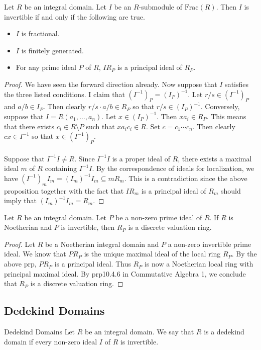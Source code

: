 \documentclass[a4paper]{article}
\begin{document}
\begin{prp}{}{} Let $R$ be an integral domain. Let $I$ be an $R$-submodule of $\text{Frac}(R)$. Then $I$ is invertible if and only if the following are true. 
\begin{itemize}
\item $I$ is fractional. 
\item $I$ is finitely generated. 
\item For any prime ideal $P$ of $R$, $IR_P$ is a principal ideal of $R_P$. 
\end{itemize} \tcbline
\begin{proof}
We have seen the forward direction already. Now suppose that $I$ satisfies the three listed conditions. I claim that $(I^{-1})_P=(I_P)^{-1}$. Let $r/s\in(I^{-1})_P$ and $a/b\in I_P$. Then clearly $r/s\cdot a/b\in R_P$ so that $r/s\in (I_P)^{-1}$. Conversely, suppose that $I=R(a_1,\dots,a_n)$. Let $x\in (I_P)^{-1}$. Then $xa_i\in R_P$. This means that there exists $c_i\in R\setminus P$ such that $xa_ic_i\in R$. Set $c=c_1\cdots c_n$. Then clearly $cx\in I^{-1}$ so that $x\in (I^{-1})_P$. \\~\\

Suppose that $I^{-1}I\neq R$. Since $I^{-1}I$ is a proper ideal of $R$, there exists a maximal ideal $m$ of $R$ containing $I^{-1}I$. By the correspondence of ideals for localization, we have $(I^{-1})_mI_m=(I_m)^{-1}I_m\subseteq mR_m$. This is a contradiction since the above proposition together with the fact that $IR_m$ is a principal ideal of $R_m$ should imply that $(I_m)^{-1}I_m=R_m$. 
\end{proof}
\end{prp}

\begin{prp}{}{} Let $R$ be an integral domain. Let $P$ be a non-zero prime ideal of $R$. If $R$ is Noetherian and $P$ is invertible, then $R_P$ is a discrete valuation ring. \tcbline
\begin{proof}
Let $R$ be a Noetherian integral domain and $P$ a non-zero invertible prime ideal. We know that $PR_P$ is the unique maximal ideal of the local ring $R_P$. By the above prp, $PR_P$ is a principal ideal. Thus $R_P$ is now a Noetherian local ring with principal maximal ideal. By prp10.4.6 in Commutative Algebra 1, we conclude that $R_P$ is a discrete valuation ring. 
\end{proof}
\end{prp}

\subsection{Dedekind Domains}
\begin{defn}{Dedekind Domains}{} Let $R$ be an integral domain. We say that $R$ is a dedekind domain if every non-zero ideal $I$ of $R$ is invertible. 
\end{defn}
\end{document}
